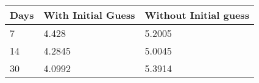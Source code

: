 \begin{tabular}{lll}
Days & With Initial Guess & Without Initial guess \\ 
\hline 
7 & 4.428 & 5.2005 \\ 
14 & 4.2845 & 5.0045 \\ 
30 & 4.0992 & 5.3914 \\ 
\hline 
\end{tabular}